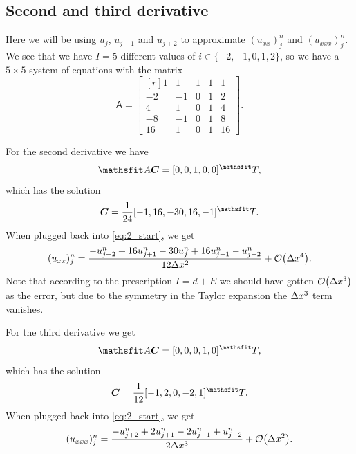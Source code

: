 \documentclass[11pt,letter, swedish, english
]{article}
\begin{document}

\subsection{Second and third derivative}
Here we will be using $u_j$, $u_{j\pm1}$ and $u_{j\pm2}$ to
approximate $(u_{xx})_j^n$ and $(u_{xxx})_j^n$. We see that we have
$I=5$ different values of $i\in\{-2, -1, 0, 1, 2\}$, so we have a
$5\times5$ system of equations with the matrix
\begin{equation}
\mathsf{A}=
\begin{bmatrix*}[r]
1&1&1&1&1\\
-2&-1&0&1&2\\
4&1&0&1&4\\
-8&-1&0&1&8\\
16&1&0&1&16
\end{bmatrix*}.
\end{equation}

For the second derivative we have
\begin{equation}
\mathsf{A}\vb*{C}=[0, 0, 1, 0, 0]^\mathsfrm{T},
\end{equation}
which has the solution
\begin{equation}
\vb*{C}=\frac{1}{24}[-1, 16, -30, 16, -1]^\mathsfrm{T}.
\end{equation}
When plugged back into \eqref{eq:2_start}, we get
\begin{equation}
(u_{xx})_j^n=\frac{-u_{j+2}^n+16u_{j+1}^n-30u_{j}^n+16u_{j-1}^n-u_{j-2}^n}{12\Dx^2}
+\order{\Dx^4}.
\end{equation}
Note that according to the prescription $I=d+E$ we should have gotten
$\order{\Dx^3}$ as the error, but due to the symmetry in the Taylor
expansion the $\Delta{x}^3$ term vanishes. 

For the third derivative we get
\begin{equation}
\mathsf{A}\vb*{C}=[0, 0, 0, 1, 0]^\mathsfrm{T},
\end{equation}
which has the solution
\begin{equation}
\vb*{C}=\frac{1}{12} [-1, 2, 0, -2, 1]^\mathsfrm{T}.
\end{equation}
When plugged back into \eqref{eq:2_start}, we get
\begin{equation}
(u_{xxx})_j^n=\frac{-u_{j+2}^n+2u_{j+1}^n-2u_{j-1}^n+u_{j-2}^n}{2\Dx^3}
+\order{\Dx^2}.
\end{equation}
\end{document}
